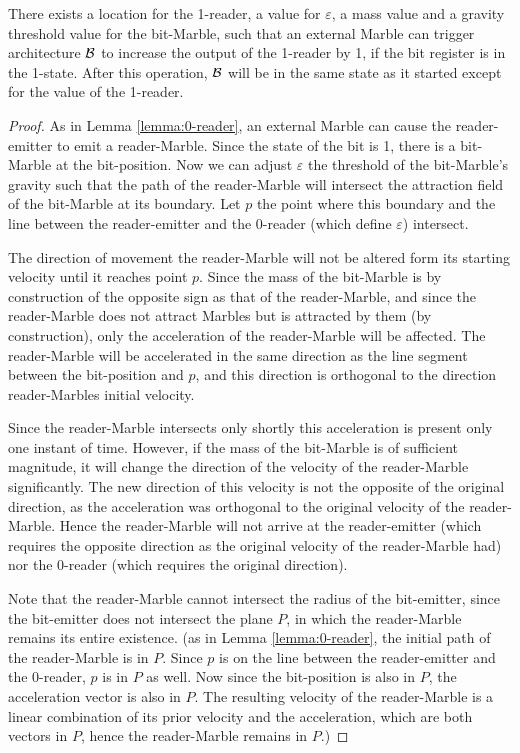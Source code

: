 \begin{lemma}
     There exists a location for the 1-reader, a value for $\varepsilon$, a mass value and a gravity threshold value for the bit-Marble, such that an external Marble can trigger architecture $\mathcal{B}$ to increase the output of the 1-reader by 1, if the bit register is in the 1-state. After this operation, $\mathcal{B}$ will be in the same state as it started except for the value of the 1-reader.
     \label{lemma:1-reader}
\end{lemma}
\begin{proof}
    As in Lemma \ref{lemma:0-reader}, an external Marble can cause the reader-emitter to emit a reader-Marble. Since the state of the bit is 1, there is a bit-Marble at the bit-position. Now we can adjust $\varepsilon$ the threshold of the bit-Marble's gravity such that the path of the reader-Marble will intersect the attraction field of the bit-Marble at its boundary. Let $p$ the point where this boundary and the line between the reader-emitter and the 0-reader (which define $\varepsilon$) intersect. 
    
    The direction of movement the reader-Marble will not be altered form its starting velocity until it reaches point $p$. Since the mass of the bit-Marble is by construction of the opposite sign as that of the reader-Marble, and since the reader-Marble does not attract Marbles but is attracted by them (by construction), only the acceleration of the reader-Marble will be affected. The reader-Marble will be accelerated in the same direction as the line segment between the bit-position and $p$, and this direction is orthogonal to the direction reader-Marbles initial velocity. 
    
    Since the reader-Marble intersects only shortly this acceleration is present only one instant of time. However, if the mass of the bit-Marble is of sufficient magnitude, it will change the direction of the velocity of the reader-Marble significantly. The new direction of this velocity is not the opposite of the original direction, as the acceleration was orthogonal to the original velocity of the reader-Marble. Hence the reader-Marble will not arrive at the reader-emitter (which requires the opposite direction as the original velocity of the reader-Marble had) nor the 0-reader (which requires the original direction). 
    
    Note that the reader-Marble cannot intersect the radius of the bit-emitter, since the bit-emitter does not intersect the plane $P$, in which the reader-Marble remains its entire existence.
    (as in Lemma \ref{lemma:0-reader}, the initial path of the reader-Marble is in $P$. Since $p$ is on the line between the reader-emitter and the 0-reader, $p$ is in $P$ as well. Now since the bit-position is also in $P$, the acceleration vector is also in $P$. The resulting velocity of the reader-Marble is a linear combination of its prior velocity and the acceleration, which are both vectors in $P$, hence the reader-Marble remains in $P$.)
    

\end{proof}
